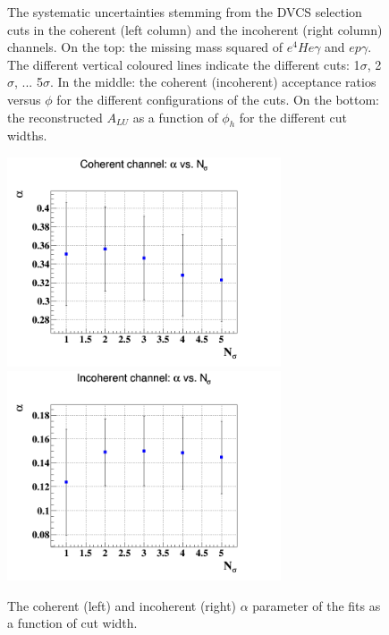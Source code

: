 \begin{figure}[h!]
\caption{The systematic uncertainties stemming from the DVCS selection cuts in 
the coherent (left column) and the incoherent (right column) channels. On the 
top: the missing mass squared of $e^{4}He\gamma$ and $ep\gamma$. The different 
vertical coloured lines indicate the different cuts: 1$\sigma$, 2$\sigma$, ...  
5$\sigma$. In the middle: the coherent (incoherent) acceptance ratios versus 
$\phi$ for the different configurations of the cuts. On the bottom: the 
reconstructed $A_{LU}$ as a function of $\phi_{h}$ for the different cut 
widths.}
\label{fig:cuts_e4Hegamma_M2_Mis}
\end{figure}

\begin{figure}[tbp]
 \includegraphics[height=6.2cm]{fig_dvcs/coh_alpha_Nsig.png}
    \includegraphics[height=6.2cm]{fig_dvcs/incoh_alpha_Nsig.png}
       \caption{The coherent (left) and incoherent (right) $\alpha$ parameter 
          of
       the fits as a function of cut width.  }
       \label{fig:sys_fit_alpha}
    \end{figure}

